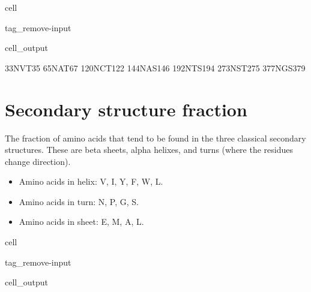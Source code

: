 \documentclass[letterpaper,10pt,english]{jupyterBook}
\begin{document}
\begin{sphinxuseclass}{cell}
\begin{sphinxuseclass}{tag_remove-input}\begin{sphinxVerbatimOutput}

\begin{sphinxuseclass}{cell_output}
\begin{sphinxVerbatim}[commandchars=\\\{\}]
33\PYGZhy{}NVT\PYGZhy{}35
65\PYGZhy{}NAT\PYGZhy{}67
120\PYGZhy{}NCT\PYGZhy{}122
144\PYGZhy{}NAS\PYGZhy{}146
192\PYGZhy{}NTS\PYGZhy{}194
273\PYGZhy{}NST\PYGZhy{}275
377\PYGZhy{}NGS\PYGZhy{}379
\end{sphinxVerbatim}

\end{sphinxuseclass}\end{sphinxVerbatimOutput}

\end{sphinxuseclass}
\end{sphinxuseclass}

\section{Secondary structure fraction}
\label{\detokenize{ipynb/chapter1:secondary-structure-fraction}}
\sphinxAtStartPar
The fraction of amino acids that tend to be found in the three classical secondary structures. These are beta sheets, alpha helixes, and turns (where the residues change direction).
\begin{itemize}
\item {} 
\sphinxAtStartPar
Amino acids in helix: V, I, Y, F, W, L.

\item {} 
\sphinxAtStartPar
Amino acids in turn: N, P, G, S.

\item {} 
\sphinxAtStartPar
Amino acids in sheet: E, M, A, L.

\end{itemize}

\begin{sphinxuseclass}{cell}
\begin{sphinxuseclass}{tag_remove-input}\begin{sphinxVerbatimOutput}

\begin{sphinxuseclass}{cell_output}
\noindent{}

\end{sphinxuseclass}\end{sphinxVerbatimOutput}

\end{sphinxuseclass}
\end{sphinxuseclass}
\end{document}
